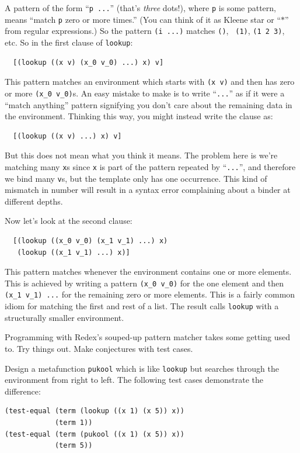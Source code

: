 A pattern of the form ``{\tt p ...}'' (that's \emph{three} dots!),
where {\tt p} is some pattern, means ``match {\tt p} zero or more
times.''  (You can think of it as Kleene star or ``$*$'' from regular
expressions.)  So the pattern {\tt (i ...)} matches {\tt ()}, {\tt
  (1)}, {\tt (1 2 3)}, etc.  So in the first clause of {\tt lookup}:
\begin{verbatim}
  [(lookup ((x v) (x_0 v_0) ...) x) v]
\end{verbatim}
This pattern matches an environment which starts with {\tt (x v)} and
then has zero or more {\tt (x\_0 v\_0)}s.  An easy mistake to make is to
write ``{\tt ...}'' as if it were a ``match anything'' pattern
signifying you don't care about the remaining data in the environment.
Thinking this way, you might instead write the clause as:
\begin{verbatim}
  [(lookup ((x v) ...) x) v]
\end{verbatim}
But this does not mean what you think it means.  The problem here is
we're matching many {\tt x}s since {\tt x} is part of the pattern
repeated by ``{\tt ...}'', and therefore we bind many {\tt v}s, but
the template only has one occurrence.  This kind of mismatch in number
will result in a syntax error complaining about a binder at different
depths.

Now let's look at the second clause:
\begin{verbatim}
  [(lookup ((x_0 v_0) (x_1 v_1) ...) x) 
   (lookup ((x_1 v_1) ...) x)]
\end{verbatim}
This pattern matches whenever the environment contains one or more
elements.  This is achieved by writing a pattern {\tt (x\_0 v\_0)} for
the one element and then {\tt (x\_1 v\_1) ...} for the remaining zero
or more elements.  This is a fairly common idiom for matching the
first and rest of a list.  The result calls {\tt lookup} with a
structurally smaller environment.


Programming with Redex's souped-up pattern matcher takes some getting
used to.  Try things out.  Make conjectures with test cases.

\begin{exercise} 
Design a metafunction {\tt pukool} which is like {\tt lookup} but
searches through the environment from right to left.  The following
test cases demonstrate the difference:
\begin{verbatim}
(test-equal (term (lookup ((x 1) (x 5)) x))
            (term 1))
(test-equal (term (pukool ((x 1) (x 5)) x))
            (term 5))
\end{verbatim}
\end{exercise}


